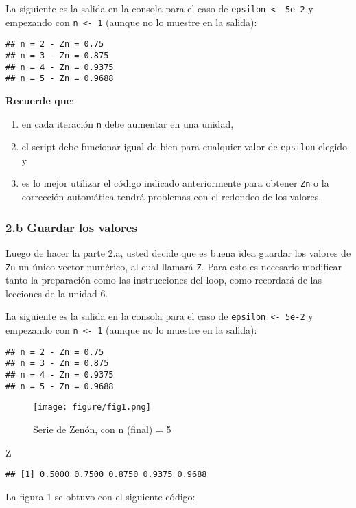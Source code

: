 \documentclass[]{article}
\makeatletter
\newenvironment{Shaded}{}{}
\newcommand{\NormalTok}[1]{{#1}}
\def\maxwidth{\ifdim\Gin@nat@width>\linewidth\linewidth
\else\Gin@nat@width\fi}
\let\Oldincludegraphics\includegraphics
\renewcommand{\includegraphics}[1]{\Oldincludegraphics[width=\maxwidth]{#1}}
\makeatother
\begin{document}
La siguiente es la salida en la consola para el caso de
\texttt{epsilon \textless{}- 5e-2} y empezando con
\texttt{n \textless{}- 1} (aunque no lo muestre en la salida):

\begin{verbatim}
## n = 2 - Zn = 0.75 
## n = 3 - Zn = 0.875 
## n = 4 - Zn = 0.9375 
## n = 5 - Zn = 0.9688
\end{verbatim}
\textbf{Recuerde que}:

\begin{enumerate}[1.]
\item
  en cada iteración \texttt{n} debe aumentar en una unidad,
\item
  el script debe funcionar igual de bien para cualquier valor de
  \texttt{epsilon} elegido y
\item
  es lo mejor utilizar el código indicado anteriormente para obtener
  \texttt{Zn} o la corrección automática tendrá problemas con el
  redondeo de los valores.
\end{enumerate}
\subsubsection{2.b Guardar los valores}

Luego de hacer la parte 2.a, usted decide que es buena idea guardar los
valores de \texttt{Zn} un único vector numérico, al cual llamará
\texttt{Z}. Para esto es necesario modificar tanto la preparación como
las instrucciones del loop, como recordará de las lecciones de la unidad
6.

La siguiente es la salida en la consola para el caso de
\texttt{epsilon \textless{}- 5e-2} y empezando con
\texttt{n \textless{}- 1} (aunque no lo muestre en la salida):

\begin{verbatim}
## n = 2 - Zn = 0.75 
## n = 3 - Zn = 0.875 
## n = 4 - Zn = 0.9375 
## n = 5 - Zn = 0.9688
\end{verbatim}
\begin{figure}[htbp]
\centering
\texttt{[image: figure/fig1.png]}
\caption{Serie de Zenón, con n (final) = 5}
\end{figure}

\begin{Shaded}
\begin{Highlighting}[]
\NormalTok{Z}
\end{Highlighting}
\end{Shaded}
\begin{verbatim}
## [1] 0.5000 0.7500 0.8750 0.9375 0.9688
\end{verbatim}
La figura 1 se obtuvo con el siguiente código:
\end{document}

